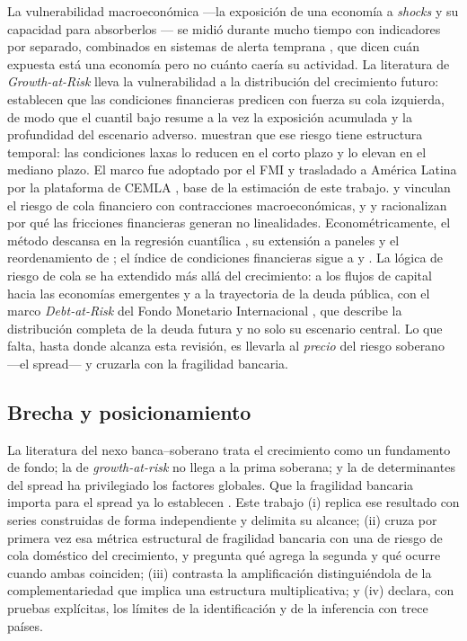 La vulnerabilidad macroeconómica ---la exposición de una economía a \textit{shocks} y su capacidad para absorberlos \citep{BriguglioEtAl2009}--- se midió durante mucho tiempo con indicadores por separado, combinados en sistemas de alerta temprana \citep{KaminskyLizondoReinhart1998}, que dicen cuán expuesta está una economía pero no cuánto caería su actividad. La literatura de \textit{Growth-at-Risk} lleva la vulnerabilidad a la distribución del crecimiento futuro: \citet{ABG2019b} establecen que las condiciones financieras predicen con fuerza su cola izquierda, de modo que el cuantil bajo resume a la vez la exposición acumulada y la profundidad del escenario adverso. \citet{AdrianEtAl2022} muestran que ese riesgo tiene estructura temporal: las condiciones laxas lo reducen en el corto plazo y lo elevan en el mediano plazo. El marco fue adoptado por el FMI \citep{PrasadEtAl2019} y trasladado a América Latina por la plataforma de CEMLA \citep{OssandonBusch2022}, base de la estimación de este trabajo. \citet{AllenBaliTang2012} y \citet{GiglioKellyPruitt2016} vinculan el riesgo de cola financiero con contracciones macroeconómicas, y \citet{BrunnermeierSannikov2014} y \citet{HeKrishnamurthy2013} racionalizan por qué las fricciones financieras generan no linealidades. Econométricamente, el método descansa en la regresión cuantílica \citep{KoenkerBassett1978,Koenker2005}, su extensión a paneles \citep{Koenker2004,Canay2011,MachadoSantosSilva2019} y el reordenamiento de \citet{ChernozhukovEtAl2010}; el índice de condiciones financieras sigue a \citet{HatziusEtAl2010} y \citet{HolloKremerLoDuca2012}. La lógica de riesgo de cola se ha extendido más allá del crecimiento: a los flujos de capital hacia las economías emergentes \citep{GelosEtAl2022} y a la trayectoria de la deuda pública, con el marco \textit{Debt-at-Risk} del Fondo Monetario Internacional \citep{IMF2024FM}, que describe la distribución completa de la deuda futura y no solo su escenario central. Lo que falta, hasta donde alcanza esta revisión, es llevarla al \emph{precio} del riesgo soberano ---el spread--- y cruzarla con la fragilidad bancaria.

\subsection{Brecha y posicionamiento}

La literatura del nexo banca--soberano trata el crecimiento como un fundamento de fondo; la de \textit{growth-at-risk} no llega a la prima soberana; y la de determinantes del spread ha privilegiado los factores globales. Que la fragilidad bancaria importa para el spread ya lo establecen \citet{Chari2024b}. Este trabajo (i) replica ese resultado con series construidas de forma independiente y delimita su alcance; (ii) cruza por primera vez esa métrica estructural de fragilidad bancaria con una de riesgo de cola doméstico del crecimiento, y pregunta qué agrega la segunda y qué ocurre cuando ambas coinciden; (iii) contrasta la amplificación distinguiéndola de la complementariedad que implica una estructura multiplicativa; y (iv) declara, con pruebas explícitas, los límites de la identificación y de la inferencia con trece países.

